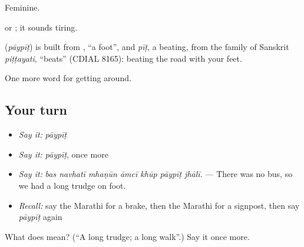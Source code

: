 Feminine.

  or  ; it sounds tiring.

\begin{cousinweb}
\textbf{} (\emph{pāypīṭ}) is built from \textbf{}, \textquotedblleft{}a foot\textquotedblright{}, and \emph{pīṭ}, a beating, from the family of Sanskrit \emph{piṭṭayati}, \textquotedblleft{}beats\textquotedblright{} (CDIAL 8165): beating the road with your feet.
\end{cousinweb}

\begin{grammarlens}[title={What you've built}]
One more word for getting around.
\end{grammarlens}

\subsection*{Your turn}
\begin{itemize}
\raggedright
  \item \emph{Say it:} \emph{pāypīṭ}
  \item \emph{Say it:} \emph{pāypīṭ}, once more
  \item \emph{Say it:} \emph{bas navhatī mhaṇūn āmcī khūp pāypīṭ jhālī.} — There was no bus, so we had a long trudge on foot.
  \item \emph{Recall:} say the Marathi for a brake, then the Marathi for a signpost, then say \emph{pāypīṭ} again
\end{itemize}

\begin{tcolorbox}[breakable,colback=teal!4,colframe=teal!35!black,title={Before you move on}]
What does  mean? (\textquotedblleft{}A long trudge; a long walk\textquotedblright{}.) Say it once more.
\end{tcolorbox}

